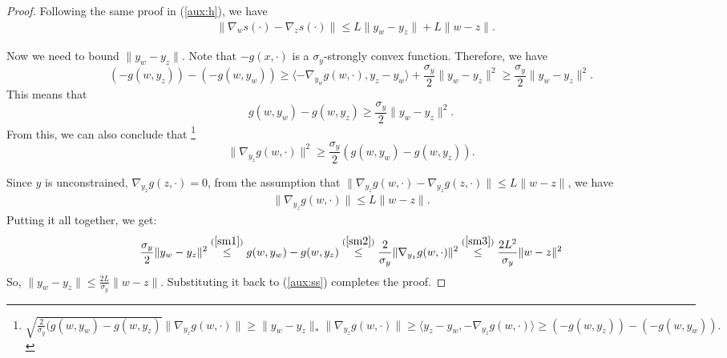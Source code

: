 \documentclass[final,12pt]{colt2018} %
\newcommand{\yx}[1]{y_{#1}}
\begin{document}
\begin{proof}
Following the same proof in (\ref{aux:h}), we have
\begin{equation} \label{aux:ss}
\begin{aligned}
& \| \nabla_w s(\cdot) - \nabla_z s(\cdot )\| 
\leq L \|  \yx{w}  - \yx{z}  \| 
+ 
L \| w - z \|.
\end{aligned}
\end{equation}

Now we need to bound $\| \yx{w} - \yx{z} \|$. 
Note that $-g(x,\cdot)$ is a $\sigma_{y}$-strongly convex function.
  Therefore, we have 
\begin{equation} \label{sm1}
( - g(w,\yx{z}) ) -  ( - g(w,\yx{w}) )  \ge \langle -\nabla_{\yx{w}} g(w,\cdot), \yx{z} - \yx{w} \rangle + \frac{\sigma_y}{2}\| \yx{w} - \yx{z} \|^2 \geq \frac{\sigma_y}{2} \| \yx{w} - \yx{z}\|^2 . 
\end{equation} 
This means that 
$$ g(w,\yx{w}) - g(w,\yx{z}) \geq \frac{\sigma_y}{2} \| \yx{w} - \yx{z}\|^2.$$
From this, we can also conclude that 
\footnote{ $ \sqrt{ \frac{2}{\sigma_y} ( g(w,\yx{w}) - g(w,\yx{z})   } \| \nabla_{\yx{z}} g(w, \cdot) \|
\geq \|  \yx{w} - \yx{z} \|_* \| \nabla_{\yx{z}} g(w, \cdot) \| \geq \langle \yx{z} - \yx{w} , -\nabla_{\yx{z}} g(w, \cdot) \rangle \geq ( - g(w,\yx{z}) ) -  ( - g(w,\yx{w}) ).$} 
\begin{equation} \label{sm2}
\| \nabla_{\yx{z}} g(w, \cdot)  \|^2 \geq \frac{\sigma_y}{2} ( g(w,\yx{w})-g(w,\yx{z}) ).
\end{equation}

  Since $y$ is unconstrained, $\nabla_{\yx{z}} g(z,\cdot) = 0$, from 
the assumption that $\| \nabla_{\yx{z}} g(w,\cdot) - \nabla_{\yx{z}} g(z,\cdot) \| \le L \| w - z \|$,
we have
  \begin{align} \label{sm3}
  \| \nabla_{\yx{z}} g(w,\cdot) \| \le L \| w - z\|.
  \end{align}
  Putting it all together, we get:
  \begin{equation}
  \begin{aligned}
&  \frac{\sigma_y}{2} \| \yx{w} - \yx{z} \|^2  \overset{(\ref{sm1})}{\le} g(w,\yx{w}) -g(w,\yx{z})  
 \overset{ (\ref{sm2}) }{\leq} \frac{2}{\sigma_y} \| \nabla_{\yx{z}} g(w,\cdot)\|^2 
\overset{ (\ref{sm3}) }{\leq} \frac{2L^2}{\sigma_y} \| w - z\|^2\\
  \end{aligned}
  \end{equation}
  So, $\| y_w - y_z\|\leq \frac{2 L}{\sigma_y} \| w - z\|$.
  Substituting it back to (\ref{aux:ss}) completes the proof.
\end{proof}
\end{document}
